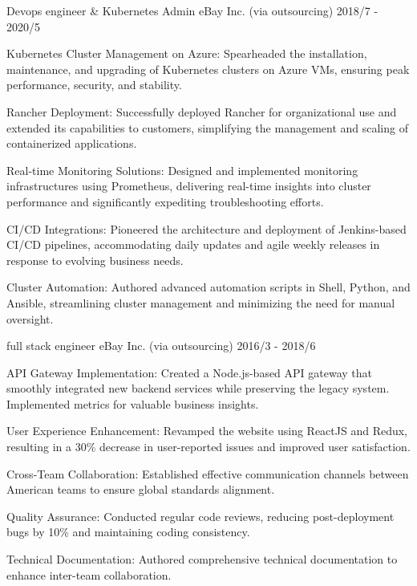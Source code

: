 \begin{cventries}
  \cventry
    {Devops engineer \& Kubernetes Admin} %
    {eBay Inc. \tiny{(via outsourcing)}} %
    {} %
    {2018/7 - 2020/5} %
    {
      \begin{cvitems} %
        \item {Kubernetes Cluster Management on Azure: Spearheaded the installation, maintenance, and upgrading of Kubernetes clusters on Azure VMs, ensuring peak performance, security, and stability.}
        \item {Rancher Deployment: Successfully deployed Rancher for organizational use and extended its capabilities to customers, simplifying the management and scaling of containerized applications.}
        \item {Real-time Monitoring Solutions: Designed and implemented monitoring infrastructures using Prometheus, delivering real-time insights into cluster performance and significantly expediting troubleshooting efforts.        }
        \item {CI/CD Integrations: Pioneered the architecture and deployment of Jenkins-based CI/CD pipelines, accommodating daily updates and agile weekly releases in response to evolving business needs.        }
        \item {Cluster Automation: Authored advanced automation scripts in Shell, Python, and Ansible, streamlining cluster management and minimizing the need for manual oversight.        }
      \end{cvitems}
    }
  \cventry
    {full stack engineer } %
    {eBay Inc. \tiny{(via outsourcing)}} %
    {} %
    {2016/3 - 2018/6} %
    {
      \begin{cvitems} %
        \item {API Gateway Implementation: Created a Node.js-based API gateway that smoothly integrated new backend services while preserving the legacy system. Implemented metrics for valuable business insights.}
        \item {User Experience Enhancement: Revamped the website using ReactJS and Redux, resulting in a 30\% decrease in user-reported issues and improved user satisfaction.  }
        \item {Cross-Team Collaboration: Established effective communication channels between American teams to ensure global standards alignment.    }
        \item {Quality Assurance: Conducted regular code reviews, reducing post-deployment bugs by 10\% and maintaining coding consistency.    }
        \item {Technical Documentation: Authored comprehensive technical documentation to enhance inter-team collaboration.    }
      \end{cvitems}
    }


\end{cventries}
